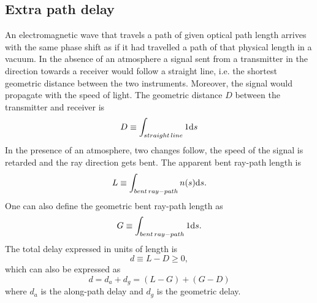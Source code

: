 \subsection{Extra path delay}
%
An electromagnetic wave that travels a path of given optical path 
length arrives with the same phase shift as if it had travelled a 
path of that physical length in a vacuum. 
In the absence of an atmosphere a signal
sent from a transmitter in the direction towards a receiver would
follow a straight line, i.e. the shortest geometric distance
between the two instruments. Moreover, the signal would propagate
with the speed of light.
The geometric distance \(D\) between the transmitter and receiver is
\begin{equation}
D\equiv\int_{straight\,line}1\mathrm{d} s
\end{equation}
In the presence of an atmosphere, two changes follow,
the speed of the signal is retarded and the ray direction gets 
bent. 
The apparent bent ray-path length is
\begin{equation}
L\equiv\int_{bent\,ray-path}n(s)\mathrm{d} s.
\end{equation}
One can also define the geometric bent ray-path length as
\begin{equation}
G\equiv\int_{bent\,ray-path}1\mathrm{d} s.
\end{equation}
The total delay expressed in units of length is 
\begin{equation}
d \equiv L-D \ge 0,
\end{equation}
which can also be expressed as
\begin{equation} 
d=d_{a}+d_{g}=(L-G)+(G-D)
\end{equation}
where \(d_{a}\) is the along-path delay
and \(d_{g}\) is the geometric delay.


